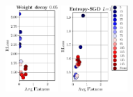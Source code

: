 \begin{figure}
\begin{minipage}[t]{0.11\textwidth}
	\end{minipage}
	\begin{minipage}[t]{0.11\textwidth}
		\includegraphics[height=3.25cm]{plots_supp_flatness_epochs_correlation_joint_wd005}
	\end{minipage}
	\begin{minipage}[t]{0.145\textwidth}
		\includegraphics[height=3.25cm]{plots_supp_flatness_epochs_correlation_joint_esgd1}
	\end{minipage}
	\\[2.5px]
	

\end{figure}
